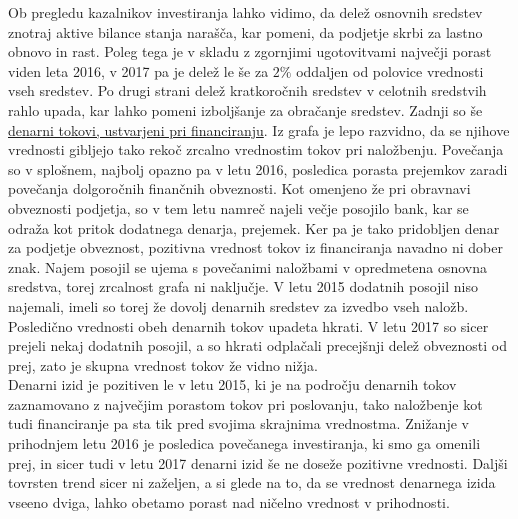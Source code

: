 \documentclass[12pt,a4paper]{amsart}
\theoremstyle{definition} %
\theoremstyle{plain} %
\begin{document}
Ob pregledu kazalnikov investiranja lahko vidimo, da delež osnovnih sredstev znotraj aktive bilance stanja narašča, kar pomeni, da podjetje skrbi za lastno obnovo in rast. Poleg tega je v skladu z zgornjimi ugotovitvami največji porast viden leta 2016, v 2017 pa je delež le še za $2\%$ oddaljen od polovice vrednosti vseh sredstev. Po drugi strani delež kratkoročnih sredstev v celotnih sredstvih rahlo upada, kar lahko pomeni izboljšanje za obračanje sredstev.
Zadnji so še \underline{denarni tokovi, ustvarjeni pri financiranju}. Iz grafa je lepo razvidno, da se njihove vrednosti gibljejo tako rekoč zrcalno vrednostim tokov pri naložbenju. Povečanja so v splošnem, najbolj opazno pa v letu 2016, posledica porasta prejemkov zaradi povečanja dolgoročnih finančnih obveznosti. Kot omenjeno že pri obravnavi obveznosti podjetja, so v tem letu namreč najeli večje posojilo bank, kar se odraža kot pritok dodatnega denarja, prejemek. Ker pa je tako pridobljen denar za podjetje obveznost, pozitivna vrednost tokov iz financiranja navadno ni dober znak. Najem posojil se ujema s povečanimi naložbami v opredmetena osnovna sredstva, torej zrcalnost grafa ni naključje. V letu 2015 dodatnih posojil niso najemali, imeli so torej že dovolj denarnih sredstev za izvedbo vseh naložb. Posledično vrednosti obeh denarnih tokov upadeta hkrati. V letu 2017 so sicer prejeli nekaj dodatnih posojil, a so hkrati odplačali precejšnji delež obveznosti od prej, zato je skupna vrednost tokov že vidno nižja.\\
Denarni izid je pozitiven le v letu 2015, ki je na področju denarnih tokov zaznamovano z največjim porastom tokov pri poslovanju, tako naložbenje kot tudi financiranje pa sta tik pred svojima skrajnima vrednostma. Znižanje v prihodnjem letu 2016 je posledica povečanega investiranja, ki smo ga omenili prej, in sicer tudi v letu 2017 denarni izid še ne doseže pozitivne vrednosti. Daljši tovrsten trend sicer ni zaželjen, a si glede na to, da se vrednost denarnega izida vseeno dviga, lahko obetamo porast nad ničelno vrednost v prihodnosti.\\%
\end{document}

